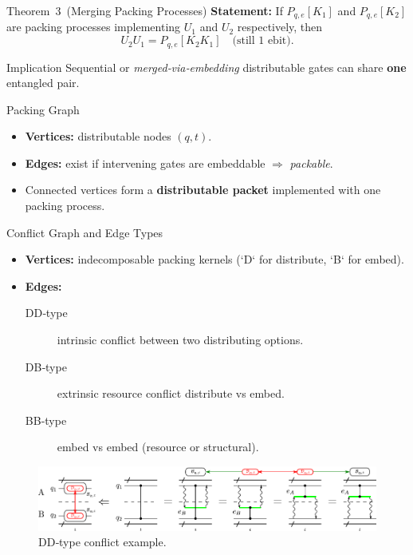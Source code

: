 \documentclass{beamer}
\begin{document}
	\begin{frame}{Theorem 3 (Merging Packing Processes)}
		\textbf{Statement:}
		If $P_{q,e}[K_1]$ and $P_{q,e}[K_2]$ are packing processes implementing $U_1$ and $U_2$ respectively, then
		\[
		U_2U_1 = P_{q,e}[K_2K_1]\quad\text{(still 1 ebit)}.
		\]
		\pause
		\begin{block}{Implication}
			Sequential or \emph{merged‑via‑embedding} distributable gates can share \textbf{one} entangled pair.
		\end{block}
	\end{frame}
	
	
	\begin{frame}{Packing Graph}
		\begin{itemize}
			\item \textbf{Vertices:} distributable nodes $(q,t)$.
			\item \textbf{Edges:} exist if intervening gates are embeddable \(\Rightarrow\) \emph{packable}.
			\item Connected vertices form a \textbf{distributable packet} implemented with one packing process.
		\end{itemize}
	\end{frame}
	
	\begin{frame}{Conflict Graph and Edge Types}
		\begin{itemize}
			\item \textbf{Vertices:} indecomposable packing kernels (`D` for distribute, `B` for embed).
			\item \textbf{Edges:}
			\begin{description}
				\item[DD‑type] intrinsic conflict between two distributing options.
				\item[DB‑type] extrinsic resource conflict distribute vs embed.
				\item[BB‑type] embed vs embed (resource or structural).
			\end{description}
		\end{itemize}
		\begin{figure}
			\includegraphics[width=.9\linewidth]{figures/conflict_DD_intrinsic.pdf}
			\caption{DD‑type conflict example.}
		\end{figure}
	\end{frame}
	
\end{document}
